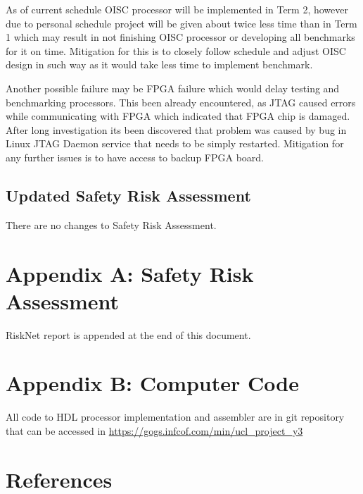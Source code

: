\documentclass[a4paper,12pt]{article}
\begin{document}
\begin{multicols}{2}
As of current schedule OISC processor will be implemented in Term 2, however due to personal schedule project will be given about twice less time than in Term 1 which may result in not finishing OISC processor or developing all benchmarks for it on time. Mitigation for this is to closely follow schedule and adjust OISC design in such way as it would take less time to implement benchmark.

Another possible failure may be FPGA failure which would delay testing and benchmarking processors. This been already encountered, as JTAG caused errors while communicating with FPGA which indicated that FPGA chip is damaged. After long investigation its been discovered that problem was caused by bug in Linux JTAG Daemon service that needs to be simply restarted. Mitigation for any further issues is to have access to backup FPGA board.

\subsection{Updated Safety Risk Assessment}
There are no changes to Safety Risk Assessment.

\end{multicols}
\pagebreak

\section{Appendix A: Safety Risk Assessment}
RiskNet report is appended at the end of this document.

\section{Appendix B: Computer Code}
All code to HDL processor implementation and assembler are in git repository that can be accessed in \url{https://gogs.infcof.com/min/ucl_project_y3}

\section{References}
\printbibliography


\end{document}
